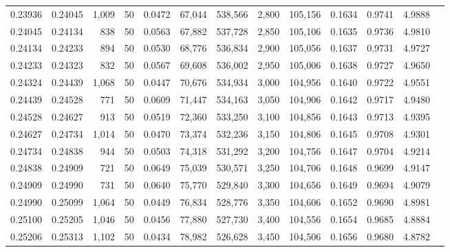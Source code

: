 \begin{tabular}{rrrrrrrrrrrrr}
0.23936 & 0.24045 & 1,009 &  50 &                                     0.0472 &  67,044 & 538,566 &   2,800 & 105,156 & 0.1634 & 0.9741 & 4.9888 \\
0.24045 & 0.24134 &   838 &  50 &                                     0.0563 &  67,882 & 537,728 &   2,850 & 105,106 & 0.1635 & 0.9736 & 4.9810 \\
0.24134 & 0.24233 &   894 &  50 &                                     0.0530 &  68,776 & 536,834 &   2,900 & 105,056 & 0.1637 & 0.9731 & 4.9727 \\
0.24233 & 0.24323 &   832 &  50 &                                     0.0567 &  69,608 & 536,002 &   2,950 & 105,006 & 0.1638 & 0.9727 & 4.9650 \\
0.24324 & 0.24439 & 1,068 &  50 &                                     0.0447 &  70,676 & 534,934 &   3,000 & 104,956 & 0.1640 & 0.9722 & 4.9551 \\
0.24439 & 0.24528 &   771 &  50 &                                     0.0609 &  71,447 & 534,163 &   3,050 & 104,906 & 0.1642 & 0.9717 & 4.9480 \\
0.24528 & 0.24627 &   913 &  50 &                                     0.0519 &  72,360 & 533,250 &   3,100 & 104,856 & 0.1643 & 0.9713 & 4.9395 \\
0.24627 & 0.24734 & 1,014 &  50 &                                     0.0470 &  73,374 & 532,236 &   3,150 & 104,806 & 0.1645 & 0.9708 & 4.9301 \\
0.24734 & 0.24838 &   944 &  50 &                                     0.0503 &  74,318 & 531,292 &   3,200 & 104,756 & 0.1647 & 0.9704 & 4.9214 \\
0.24838 & 0.24909 &   721 &  50 &                                     0.0649 &  75,039 & 530,571 &   3,250 & 104,706 & 0.1648 & 0.9699 & 4.9147 \\
0.24909 & 0.24990 &   731 &  50 &                                     0.0640 &  75,770 & 529,840 &   3,300 & 104,656 & 0.1649 & 0.9694 & 4.9079 \\
0.24990 & 0.25099 & 1,064 &  50 &                                     0.0449 &  76,834 & 528,776 &   3,350 & 104,606 & 0.1652 & 0.9690 & 4.8981 \\
0.25100 & 0.25205 & 1,046 &  50 &                                     0.0456 &  77,880 & 527,730 &   3,400 & 104,556 & 0.1654 & 0.9685 & 4.8884 \\
0.25206 & 0.25313 & 1,102 &  50 &                                     0.0434 &  78,982 & 526,628 &   3,450 & 104,506 & 0.1656 & 0.9680 & 4.8782 \\

\end{tabular}
